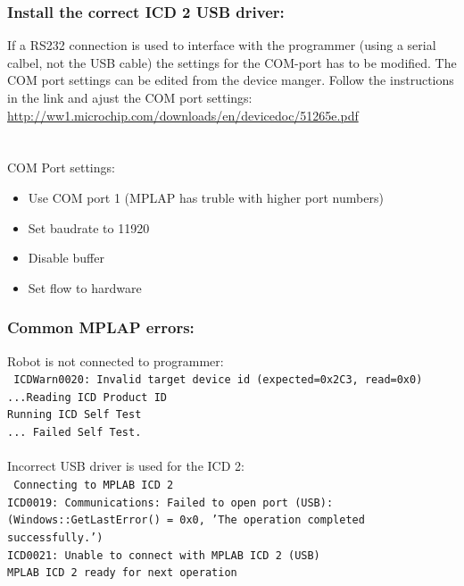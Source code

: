 \documentclass{article}
\newcommand{\stt}[1]{{\small\tt #1}}
\begin{document}
\subsubsection*{Install the correct ICD 2 USB driver:}
If a RS232 connection is used to interface with the programmer (using a serial calbel, not the USB cable) the settings for the COM-port has to be modified.
The COM port settings can be edited from the device manger. Follow the instructions in the link and ajust the COM port settings:\\
\url{http://ww1.microchip.com/downloads/en/devicedoc/51265e.pdf}\\
\\\\\noindent
COM Port settings:
\begin{itemize}
 \item Use COM port 1 (MPLAP has truble with higher port numbers)
 \item Set baudrate to 11920
 \item Disable buffer
 \item Set flow to hardware
\end{itemize}

\subsubsection*{Common MPLAP errors:}
Robot is not connected to programmer:\\
\stt{
ICDWarn0020: Invalid target device id (expected=0x2C3, read=0x0)
\\...Reading ICD Product ID
\\Running ICD Self Test
\\... Failed Self Test.}
\\\\\noindent
Incorrect USB driver is used for the ICD 2:\\
\stt{
Connecting to MPLAB ICD 2
\\ICD0019: Communications:  Failed to open port (USB): (Windows::GetLastError() = 0x0, 'The operation completed successfully.')
\\ICD0021: Unable to connect with MPLAB ICD 2 (USB)
\\MPLAB ICD 2 ready for next operation
}
\end{document}
